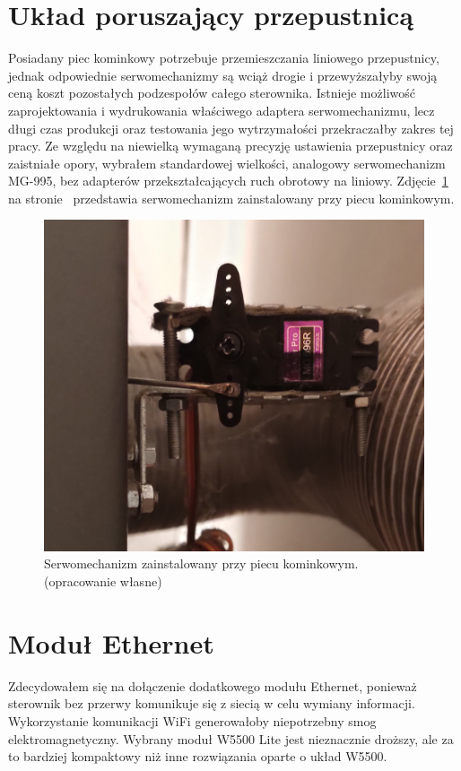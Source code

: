 \documentclass[11pt]{report}
\begin{document}
 \section{Układ poruszający przepustnicą} 
 Posiadany piec kominkowy potrzebuje przemieszczania liniowego przepustnicy, jednak odpowiednie serwomechanizmy są wciąż drogie i przewyższałyby swoją ceną koszt pozostałych podzespołów całego sterownika.
 Istnieje możliwość zaprojektowania i wydrukowania właściwego adaptera serwomechanizmu, lecz długi czas produkcji oraz testowania jego wytrzymałości przekraczałby zakres tej pracy.
  Ze względu na niewielką wymaganą precyzję ustawienia przepustnicy oraz zaistniałe opory, wybrałem standardowej wielkości, analogowy serwomechanizm MG-995, bez adapterów przekształcających ruch obrotowy na liniowy.
   Zdjęcie~\ref{fig:servo} na stronie~\pageref{fig:servo} przedstawia serwomechanizm zainstalowany przy piecu kominkowym.
    \begin{figure}[ht]
\centering
\includegraphics[width=0.8 \textwidth]{fig/servo.jpg}
\caption{Serwomechanizm zainstalowany przy piecu kominkowym. (opracowanie własne)}
\label{fig:servo}
\end{figure}
 
 \section{Moduł Ethernet}
 Zdecydowałem się na dołączenie dodatkowego modułu Ethernet, ponieważ sterownik bez przerwy komunikuje się z siecią w celu wymiany informacji. Wykorzystanie komunikacji WiFi generowałoby niepotrzebny smog elektromagnetyczny. Wybrany moduł W5500 Lite jest nieznacznie droższy, ale za to bardziej kompaktowy niż inne rozwiązania oparte o układ W5500.
 
\end{document}
